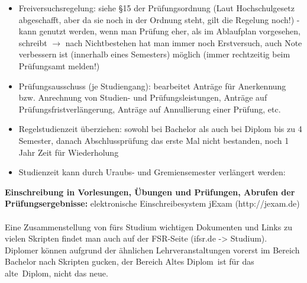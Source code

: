 \documentclass[a4paper,12pt]{report}
\begin{document}
\begin{itemize}
	\item Freiversuchsregelung: siehe \S15 der Prüfungsordnung (Laut Hochschulgesetz abgeschafft, aber da sie noch in der Ordnung steht, gilt die Regelung noch!) - kann genutzt werden, wenn man Prüfung eher, als im Ablaufplan vorgesehen, schreibt $\rightarrow$ nach Nichtbestehen hat man immer noch Erstversuch, auch Note verbessern ist (innerhalb eines Semesters) möglich (immer rechtzeitig beim Prüfungsamt melden!)
	\item Prüfungsausschuss (je Studiengang): bearbeitet Anträge für Anerkennung bzw. Anrechnung von Studien- und Prüfungsleistungen, Anträge auf Prüfungsfristverlängerung, Anträge auf Annullierung einer Prüfung, etc.
	\item Regelstudienzeit überziehen: sowohl bei Bachelor als auch bei Diplom bis zu 4 Semester, danach Abschlussprüfung das erste Mal nicht bestanden, noch 1 Jahr Zeit für Wiederholung
	\item Studienzeit kann durch Uraubs- und Gremiensemester verlängert werden:
\end{itemize}

\textbf{Einschreibung in Vorlesungen, Übungen und Prüfungen, Abrufen der Prüfungsergebnisse: }elektronische Einschreibesystem jExam (http://jexam.de)\\\\
Eine Zusammenstellung von fürs Studium wichtigen Dokumenten und Links zu vielen Skripten findet man auch auf der FSR-Seite (ifsr.de -> Studium).
Diplomer können aufgrund der ähnlichen Lehrveranstaltungen vorerst im Bereich Bachelor nach Skripten gucken, der Bereich \glqq Altes Diplom\grqq\ ist für das \glqq alte\grqq\ Diplom, nicht das neue.
\end{document}
